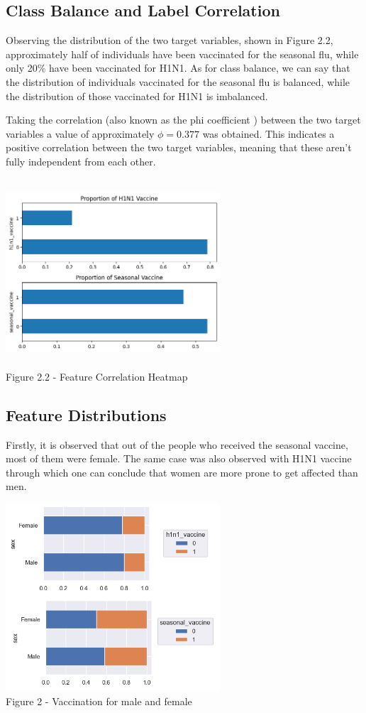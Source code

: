 \documentclass{IEEEtran}
\begin{document}
\subsection{Class Balance and Label Correlation}
Observing the distribution of the two target variables, shown in Figure 2.2, approximately half of individuals have been vaccinated for the seasonal flu, while only 20\% have been vaccinated for H1N1. As for class balance, we can say that the distribution of individuals vaccinated for the seasonal flu is balanced, while the distribution of those vaccinated for H1N1 is imbalanced.

Taking the correlation (also known as the phi coefficient ) between the two target variables a value of approximately $\phi = 0.377$ was obtained. This indicates a positive correlation between the two target variables, meaning that these aren't fully independent from each other. 
\begin{center}
    \includegraphics[width = 8cm,height=7cm]{figures/Proportion.png}\\  
    Figure 2.2 - Feature Correlation Heatmap
\end{center}



\subsection{Feature Distributions}
Firstly, it is observed that out of the people who received the seasonal vaccine, most of them were female. The same case was also observed with H1N1 vaccine through which one can conclude that women are more prone to get affected than men.
\begin{center}
    \includegraphics[width = 8cm,height=7cm]{figures/Sex.png}\\  Figure 2 - Vaccination for male and female
\end{center}
\end{document}
